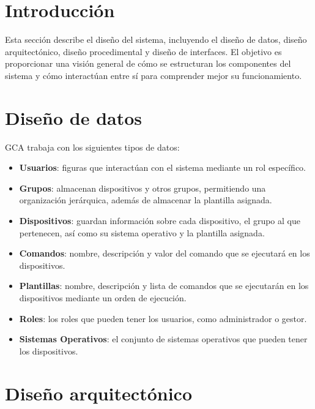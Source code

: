 
\section{Introducción}

Esta sección describe el diseño del sistema, incluyendo el diseño de datos, diseño arquitectónico, diseño procedimental
y diseño de interfaces.
El objetivo es proporcionar una visión general de cómo se estructuran los componentes del sistema y cómo interactúan entre sí
para comprender mejor su funcionamiento.

\section{Diseño de datos}

GCA trabaja con los siguientes tipos de datos:
\begin{itemize}
    \item \textbf{Usuarios}: figuras que interactúan con el sistema mediante un rol específico.
    \item \textbf{Grupos}: almacenan dispositivos y otros grupos, permitiendo una organización jerárquica, además de
    almacenar la plantilla asignada.
    \item \textbf{Dispositivos}: guardan información sobre cada dispositivo, el grupo al que pertenecen, así como
    su sistema operativo y la plantilla asignada.
    \item \textbf{Comandos}: nombre, descripción y valor del comando que se ejecutará en los dispositivos.
    \item \textbf{Plantillas}: nombre, descripción y lista de comandos que se ejecutarán en los dispositivos mediante
    un orden de ejecución.
    \item \textbf{Roles}: los roles que pueden tener los usuarios, como administrador o gestor.
    \item \textbf{Sistemas Operativos}: el conjunto de sistemas operativos que pueden tener los dispositivos.
\end{itemize}



\section{Diseño arquitectónico}

